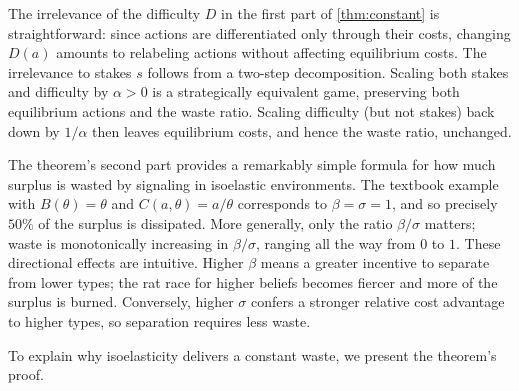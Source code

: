 \documentclass[12 pt]{article}
\theoremstyle{remark}
\theoremstyle{definition}
\begin{document}
The irrelevance of the difficulty $D$ in the first part of \autoref{thm:constant} is straightforward: since actions are differentiated only through their costs, changing $D(a)$ amounts to relabeling actions without affecting equilibrium costs. The irrelevance to stakes $s$ follows from a two-step decomposition. Scaling both stakes and difficulty by $\alpha>0$ is a strategically equivalent game, preserving both equilibrium actions and the waste ratio. Scaling difficulty (but not stakes) back down by $1/\alpha$ then leaves equilibrium costs, and hence the waste ratio, unchanged. 

The theorem's second part provides %
a remarkably simple formula for how much surplus is wasted by signaling in isoelastic environments. The textbook example \citep[e.g.][p.~329]{FT91} 
with $B(\theta)=\theta$ and $C(a,\theta)=a/\theta$ corresponds to $\beta=\sigma=1$, and so
precisely $50\%$ of the surplus is dissipated.
More generally, only the ratio $\beta/\sigma$ matters; waste is monotonically increasing in $\beta/\sigma$, ranging all the way from $0$ to $1$. These directional effects are intuitive. Higher $\beta$ means a greater incentive to separate from lower types; the rat race for higher beliefs becomes fiercer and more of the surplus is burned. Conversely, higher $\sigma$ confers a stronger relative cost advantage to higher types, so separation requires less waste. %

To explain why isoelasticity delivers a constant waste, we present the theorem's proof.

\end{document}
